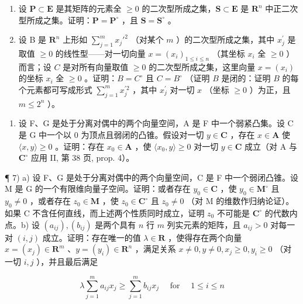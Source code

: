 \begin{enumerate}
\def\labelenumi{\alph{enumi})}
\item
  设 \(\mathbf{P} \subset \mathbf{E}\) 是其矩阵的元素全 \(\geqslant 0\) 的二次型所成之集，\(\mathbf{S} \subset \mathbf{E}\) 是 \(\mathbf{R}^n\) 中正二次型所成之集。证明：\(\mathbf{P} = \mathbf{P}^\circ\) ，且 \(\mathbf{S} = \mathbf{S}^\circ\) 。
\item
  设 B 是 \(\mathbf{R}^n\) 上形如 \(\sum_{j=1}^{m} x_j'^2\) （对某个 \(m\) ）的二次型所成之集，其中 \(x_{j}^{\prime}\) 是取值 \(\geqslant 0\) 的线性型——对一切向量 \(x = (x_{i})_{1\leqslant i\leqslant n}\) （其坐标 \(x_{i}\) 全 \(\geqslant 0\) ）而言；设 \(C\) 是对所有向量取值 \(\geqslant 0\) 的二次型所成之集，这里向量 \(x = (x_{i})\) 的坐标 \(x_{i}\) 全 \(\geqslant 0\) 。证明：\(B = C^{\circ}\) 且 \(C = B^{\circ}\) （证明 \(B\) 是闭的：证明 \(B\) 的每个元素都可写成形式 \(\sum_{j=1}^{m} x_{j}^{\prime 2}\) ，其中 \(x_{j}^{\prime}\) 对一切 \(x\) （坐标 \(\geqslant 0\) ）为正，且 \(m \leqslant 2^{n}\) ）。
\end{enumerate}

\begin{enumerate}
\def\labelenumi{\arabic{enumi})}
\setcounter{enumi}{5}
\tightlist
\item
  设 F、G 是处于分离对偶中的两个向量空间，A 是 F 中一个弱紧凸集。设 C 是 G 中一个以 0 为顶点且弱闭的凸锥。假设对一切 \(y \in \mathbf{C}\) ，存在 \(x \in \mathbf{A}\) 使 \(\langle x, y \rangle \geqslant 0\) 。证明：存在 \(x_0 \in \mathbf{A}\) ，使 \(\langle x_0, y \rangle \geqslant 0\) 对一切 \(y \in \mathbf{C}\) 成立（对 A 与 \(\mathbf{C}^\circ\) 应用 II, 第 38 页, prop. 4）。
\end{enumerate}

¶ 7) a) 设 F、G 是处于分离对偶中的两个向量空间，C 是 F 中一个弱闭凸锥。设 M 是 G 的一个有限维向量子空间。证明：或者存在 \(y_0 \in \mathbf{C}\) ，使 \(y_0 \in \mathbf{M}^\circ\) 且 \(y_0 \neq 0\) ，或者存在 \(z_0 \in \mathbf{M}\) ，使 \(z_0 \in \mathbf{C}^\circ\) 且 \(z_0 \neq 0\) （对 M 的维数作归纳论证）。如果 C 不含任何直线，而上述两个性质同时成立，证明 \(z_0\) 不可能是 \(\mathbf{C}^\circ\) 的代数内点。b) 设 \((a_{ij}), (b_{ij})\) 是两个具有 \(n\) 行 \(m\) 列实元素的矩阵，且 \(a_{ij} > 0\) 对每一对 \((i,j)\) 成立。证明：存在唯一的值 \(\lambda \in \mathbf{R}\) ，使得存在两个向量 \(x = (x_j) \in \mathbf{R}^m\) 、\(y = (y_i) \in \mathbf{R}^n\) ，满足关系 \(x \neq 0, y \neq 0, x_j \geqslant 0, y_i \geqslant 0\) （对一切 \(i,j\) ），并且最后满足

\[
\lambda \sum_ {j = 1} ^ {m} a _ {i j} x _ {j} \geqslant \sum_ {j = 1} ^ {m} b _ {i j} x _ {j} \quad \text { for } \quad 1 \leqslant i \leqslant n\tag{1}
\]

